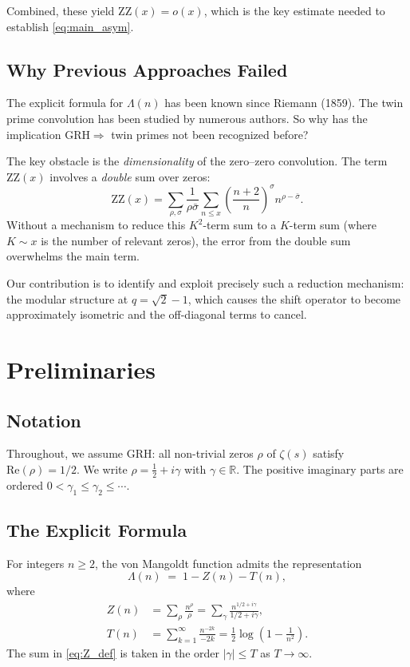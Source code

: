 \documentclass[11pt,a4paper]{article}
\theoremstyle{remark}
\newcommand{\RR}{\mathbb{R}}
\newcommand{\grh}{\mathrm{GRH}}
\newcommand{\repart}{\mathrm{Re}}
\begin{document}
Combined, these yield $\mathrm{ZZ}(x)=o(x)$, which is the key estimate needed to establish \eqref{eq:main_asym}.

\subsection{Why Previous Approaches Failed}

The explicit formula for $\Lambda(n)$ has been known since Riemann (1859).
The twin prime convolution has been studied by numerous authors.
So why has the implication $\grh\Rightarrow$ twin primes not been recognized before?

The key obstacle is the \emph{dimensionality} of the zero--zero convolution.
The term $\mathrm{ZZ}(x)$ involves a \emph{double} sum over zeros:
\[
\mathrm{ZZ}(x)=\sum_{\rho,\sigma}\frac{1}{\rho\bar\sigma}\sum_{n\le x}\left(\frac{n+2}{n}\right)^\sigma n^{\rho-\bar\sigma}.
\]
Without a mechanism to reduce this $K^2$-term sum to a $K$-term sum (where $K\sim x$ is the number of relevant zeros), the error from the double sum overwhelms the main term.

Our contribution is to identify and exploit precisely such a reduction mechanism: the modular structure at $q=\sqrt{2}-1$, which causes the shift operator to become approximately isometric and the off-diagonal terms to cancel.

\section{Preliminaries}\label{sec:prelim}

\subsection{Notation}

Throughout, we assume GRH: all non-trivial zeros $\rho$ of $\zeta(s)$ satisfy $\repart(\rho)=1/2$.
We write $\rho=\tfrac{1}{2}+i\gamma$ with $\gamma\in\RR$.
The positive imaginary parts are ordered $0<\gamma_1\le\gamma_2\le\cdots$.

\subsection{The Explicit Formula}\label{sec:explicit}

For integers $n\ge 2$, the von Mangoldt function admits the representation
\begin{equation}\label{eq:explicit_Lambda}
\Lambda(n) \;=\; 1 - Z(n) - T(n),
\end{equation}
where
\begin{align}
Z(n) &= \sum_{\rho}\frac{n^{\rho}}{\rho} = \sum_{\gamma}\frac{n^{1/2+i\gamma}}{1/2+i\gamma}, \label{eq:Z_def}\\
T(n) &= \sum_{k=1}^{\infty}\frac{n^{-2k}}{-2k} = \frac{1}{2}\log\!\left(1-\frac{1}{n^2}\right). \label{eq:T_def}
\end{align}
The sum in \eqref{eq:Z_def} is taken in the order $|\gamma|\le T$ as $T\to\infty$.
\end{document}
